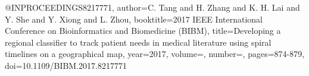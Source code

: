 @INPROCEEDINGS{8217771,
  author={C. {Tang} and H. {Zhang} and K. H. {Lai} and Y. {She} and Y. {Xiong} and L. {Zhou}},
  booktitle={2017 IEEE International Conference on Bioinformatics and Biomedicine (BIBM)}, 
  title={Developing a regional classifier to track patient needs in medical literature using spiral timelines on a geographical map}, 
  year={2017},
  volume={},
  number={},
  pages={874-879},
  doi={10.1109/BIBM.2017.8217771}}